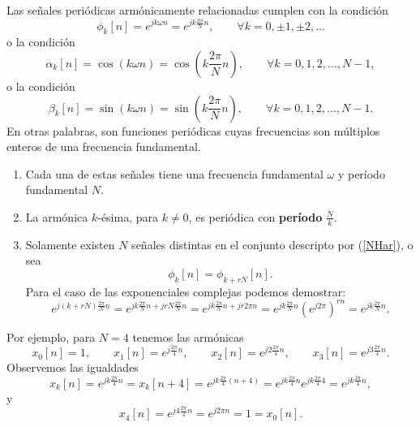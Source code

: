 \documentclass[11pt,a4paper,openany]{book}
\begin{document}
Las señales periódicas armónicamente relacionadas cumplen con la condición
\begin{equation}
	\phi_{k}[n] = e^{jk\omega n} = e^{jk\frac{2\pi}{N}n}, \qquad \forall k=0, \pm 1, \pm 2, \dots  \label{NHar}
\end{equation}
o la condición
\begin{equation}
	\alpha_{k}[n] = \cos(k\omega n) = \cos \left(k\frac{2\pi}{N}n\right), \qquad \forall k=0, 1, 2, \dots, N - 1, 
\end{equation}
o la condición
\begin{equation}
	\beta_{k}[n] = \sin(k\omega n) = \sin \left(k\frac{2\pi}{N}n\right), \qquad \forall k=0, 1, 2, \dots, N - 1.
\end{equation}
En otras palabras, son funciones periódicas cuyas frecuencias son múltiplos enteros de una frecuencia fundamental.

\begin{enumerate}
	\item Cada una de estas señales tiene una frecuencia fundamental $\omega$ y período fundamental $N$.
	\item La armónica $k$-ésima, para $k \neq 0$, es periódica con \textbf{período} $\frac{N}{k}$.
	\item Solamente existen $N$ señales distintas en el conjunto descripto por (\ref{NHar}), o sea 
	\begin{equation}
		\phi_{k}[n] = \phi_{k+rN}[n].
	\end{equation}
	Para el caso de las exponenciales complejas podemos demostrar:
	\begin{equation}
		e^{j(k + rN)\frac{2\pi}{N}n} = e^{jk\frac{2\pi}{N}n + jrN\frac{2\pi}{N}n} = e^{jk\frac{2\pi}{N}n + jr2\pi n} = e^{jk\frac{2\pi}{N}n} (e^{j2\pi})^{rn} = e^{jk\frac{2\pi}{N}n}.
	\end{equation}
\end{enumerate}

Por ejemplo, para $N = 4$ tenemos las armónicas
\begin{equation}
	x_{0}[n] = 1, \qquad x_{1}[n] = e^{j\frac{2\pi}{4}n}, \qquad x_{2}[n] = e^{j2\frac{2\pi}{4}n}, \qquad x_{3}[n] = e^{j3\frac{2\pi}{4}n}.
\end{equation}
Observemos las igualdades
\begin{equation}
	x_{k}[n] = e^{jk\frac{2\pi}{4}n} = x_{k}[n + 4] = e^{jk\frac{2\pi}{4}(n + 4)} = e^{jk\frac{2\pi}{4}n} e^{jk\frac{2\pi}{4}4} = e^{jk\frac{2\pi}{4}n},
\end{equation}
y
\begin{equation}
	x_{4}[n] = e^{j4\frac{2\pi}{4}n} = e^{j2\pi n} = 1 = x_{0}[n].
\end{equation}
\end{document}
